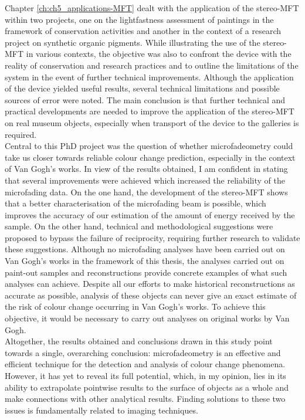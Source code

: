 Chapter \ref{ch:ch5_applications-MFT} dealt with the application of the stereo-MFT within two projects, one on the lightfastness assessment of paintings in the framework of conservation activities and another in the context of a research project on synthetic organic pigments. While illustrating the use of the stereo-MFT in various contexts, the objective was also to confront the device with the reality of conservation and research practices and to outline the limitations of the system in the event of further technical improvements. Although the application of the device yielded useful results, several technical limitations and possible sources of error were noted. The main conclusion is that further technical and practical developments are needed to improve the application of the stereo-MFT on real museum objects, especially when transport of the device to the galleries is required. \\


Central to this PhD project was the question of whether microfadeometry could take us closer towards reliable colour change prediction, especially in the context of Van Gogh’s works. In view of the results obtained, I am confident in stating that several improvements were achieved which increased the reliability of the microfading data. On the one hand, the development of the stereo-MFT shows that a better characterisation of the microfading beam is possible, which improves the accuracy of our estimation of the amount of energy received by the sample. On the other hand, technical and methodological suggestions were proposed to bypass the failure of reciprocity, requiring further research to validate these suggestions. Although no microfading analyses have been carried out on Van Gogh's works in the framework of this thesis, the analyses carried out on paint-out samples and reconstructions provide concrete examples of what such analyses can achieve. Despite all our efforts to make historical reconstructions as accurate as possible, analysis of these objects can never give an exact estimate of the risk of colour change occurring in Van Gogh’s works. To achieve this objective, it would be necessary to carry out analyses on original works by Van Gogh. \\


Altogether,  the results obtained and conclusions drawn in this study point towards  a single, overarching conclusion: microfadeometry is an effective and efficient technique for the detection and analysis of colour change phenomena. However, it has yet to reveal its full potential, which, in my opinion, lies in its ability to extrapolate pointwise results to the surface of objects as a whole and make connections with other analytical results. Finding solutions to these two issues is fundamentally related to  imaging techniques.  \\


